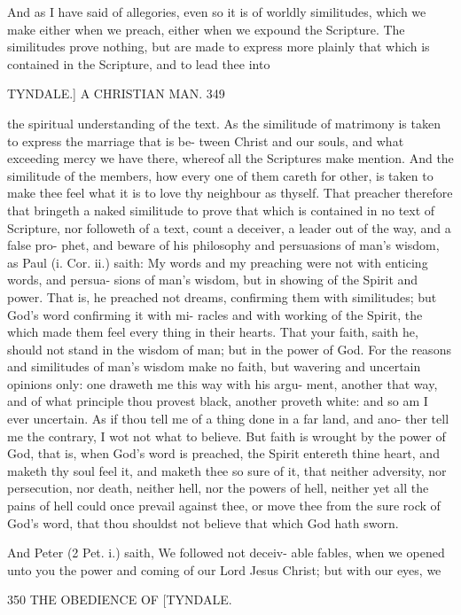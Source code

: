 \documentclass{custom}
\begin{document}
{And as I have said of allegories, even so it is of worldly 
similitudes, which we make either when we preach, 
either when we expound the Scripture. The similitudes 
prove nothing, but are made to express more plainly that 
which is contained in the Scripture, and to lead thee into 


TYNDALE.] A CHRISTIAN MAN. 349

the spiritual understanding of the text. As the similitude 
of matrimony is taken to express the marriage that is be- 
tween Christ and our souls, and what exceeding mercy we 
have there, whereof all the Scriptures make mention. 
And the similitude of the members, how every one of them 
careth for other, is taken to make thee feel what it is to 
love thy neighbour as thyself. That preacher therefore
that bringeth a naked similitude to prove that which is
contained in no text of Scripture, nor followeth of a text,
count a deceiver, a leader out of the way, and a false pro-
phet, and beware of his philosophy and persuasions of
man's wisdom, as Paul (i. Cor. ii.) saith: My words and
my preaching were not with enticing words, and persua-
sions of man's wisdom, but in showing of the Spirit and
power. That is, he preached not dreams, confirming them 
with similitudes; but God's word confirming it with mi- 
racles and with working of the Spirit, the which made 
them feel every thing in their hearts. That your faith, 
saith he, should not stand in the wisdom of man; but in 
the power of God. For the reasons and similitudes of
man's wisdom make no faith, but wavering and uncertain
opinions only: one draweth me this way with his argu-
ment, another that way, and of what principle thou provest
black, another proveth white: and so am I ever uncertain.
As if thou tell me of a thing done in a far land, and ano-
ther tell me the contrary, I wot not what to believe. 
But faith is wrought by the power of God, that is, when
God's word is preached, the Spirit entereth thine heart,
and maketh thy soul feel it, and maketh thee so sure of it,
that neither adversity, nor persecution, nor death, neither 
hell, nor the powers of hell, neither yet all the pains of hell 
could once prevail against thee, or move thee from the 
sure rock of God's word, that thou shouldst not believe
that which God hath sworn.

And Peter (2 Pet. i.) saith, We followed not deceiv-
able fables, when we opened unto you the power and
coming of our Lord Jesus Christ; but with our eyes, we


350
THE OBEDIENCE OF
[TYNDALE.

}
\end{document}
